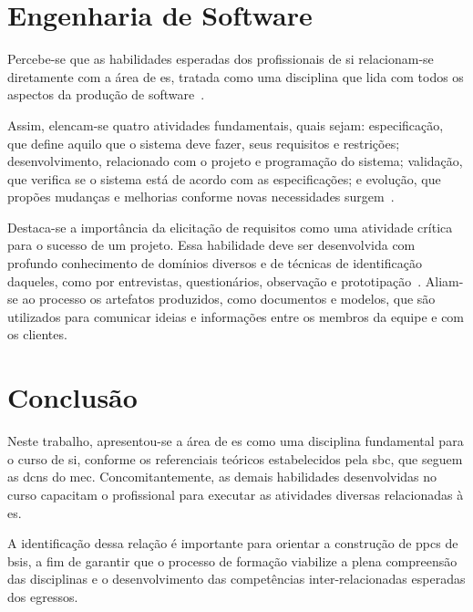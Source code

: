 \documentclass[12pt]{article}
\begin{document}
\section{Engenharia de Software}%
\label{sec:engenharia_de_software}

Percebe-se que as habilidades esperadas dos profissionais de \gls{si} relacionam-se diretamente com a área de \gls{es}, tratada como uma disciplina que lida com todos os aspectos da produção de software~\cite{sommerville2011software}.

Assim, elencam-se quatro atividades fundamentais, quais sejam: especificação, que define aquilo que o sistema deve fazer, seus requisitos e restrições; desenvolvimento, relacionado com o projeto e programação do sistema; validação, que verifica se o sistema está de acordo com as especificações; e evolução, que propões mudanças e melhorias conforme novas necessidades surgem~\cite{sommerville2011software}.

Destaca-se a importância da elicitação de requisitos como uma atividade crítica para o sucesso de um projeto.
Essa habilidade deve ser desenvolvida com profundo conhecimento de domínios diversos e de técnicas de identificação daqueles, como por entrevistas, questionários, observação e prototipação~\cite{sommerville2011software}.
Aliam-se ao processo os artefatos produzidos, como documentos e modelos, que são utilizados para comunicar ideias e informações entre os membros da equipe e com os clientes.

\section{Conclusão}%
\label{sec:conclusao}

Neste trabalho, apresentou-se a área de \gls{es} como uma disciplina fundamental para o curso de \gls{si}, conforme os referenciais teóricos estabelecidos pela \gls{sbc}, que seguem as \glspl{dcn} do \gls{mec}.
Concomitantemente, as demais habilidades desenvolvidas no curso capacitam o profissional para executar as atividades diversas relacionadas à \gls{es}.

A identificação dessa relação é importante para orientar a construção de \glspl{ppc} de \glspl{bsi}, a fim de garantir que o processo de formação viabilize a plena compreensão das disciplinas e o desenvolvimento das competências inter-relacionadas esperadas dos egressos.

\printbibliography{}
\end{document}
